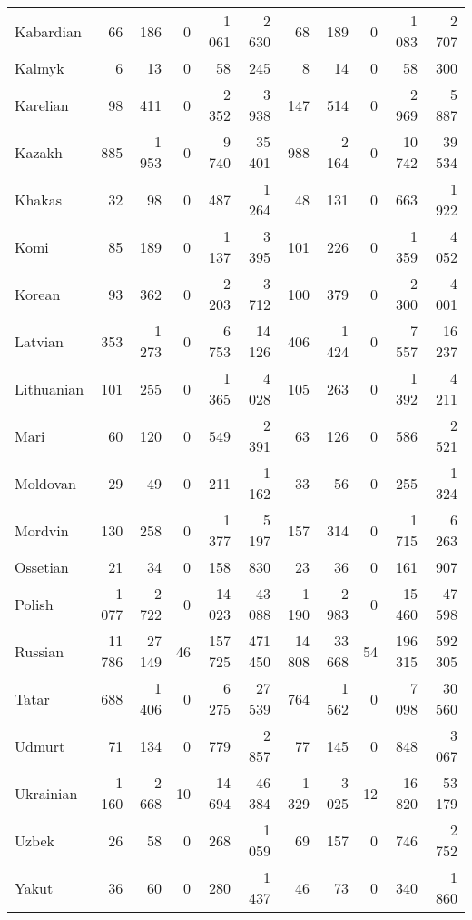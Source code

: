 \begin{table}[!h]
\begin{tabular}{lrrrrrrrrrr}
Kabardian & 66 & 186 & 0 & 1 061 & 2 630 & 68 & 189 & 0 & 1 083 & 2 707\\
Kalmyk & 6 & 13 & 0 & 58 & 245 & 8 & 14 & 0 & 58 & 300\\
Karelian & 98 & 411 & 0 & 2 352 & 3 938 & 147 & 514 & 0 & 2 969 & 5 887\\
Kazakh & 885 & 1 953 & 0 & 9 740 & 35 401 & 988 & 2 164 & 0 & 10 742 & 39 534\\
Khakas & 32 & 98 & 0 & 487 & 1 264 & 48 & 131 & 0 & 663 & 1 922\\
Komi & 85 & 189 & 0 & 1 137 & 3 395 & 101 & 226 & 0 & 1 359 & 4 052\\
Korean & 93 & 362 & 0 & 2 203 & 3 712 & 100 & 379 & 0 & 2 300 & 4 001\\
Latvian & 353 & 1 273 & 0 & 6 753 & 14 126 & 406 & 1 424 & 0 & 7 557 & 16 237\\
Lithuanian & 101 & 255 & 0 & 1 365 & 4 028 & 105 & 263 & 0 & 1 392 & 4 211\\
Mari & 60 & 120 & 0 & 549 & 2 391 & 63 & 126 & 0 & 586 & 2 521\\
Moldovan & 29 & 49 & 0 & 211 & 1 162 & 33 & 56 & 0 & 255 & 1 324\\
Mordvin & 130 & 258 & 0 & 1 377 & 5 197 & 157 & 314 & 0 & 1 715 & 6 263\\
Ossetian & 21 & 34 & 0 & 158 & 830 & 23 & 36 & 0 & 161 & 907\\
Polish & 1 077 & 2 722 & 0 & 14 023 & 43 088 & 1 190 & 2 983 & 0 & 15 460 & 47 598\\
Russian & 11 786 & 27 149 & 46 & 157 725 & 471 450 & 14 808 & 33 668 & 54 & 196 315 & 592 305\\
Tatar & 688 & 1 406 & 0 & 6 275 & 27 539 & 764 & 1 562 & 0 & 7 098 & 30 560\\
Udmurt & 71 & 134 & 0 & 779 & 2 857 & 77 & 145 & 0 & 848 & 3 067\\
Ukrainian & 1 160 & 2 668 & 10 & 14 694 & 46 384 & 1 329 & 3 025 & 12 & 16 820 & 53 179\\
Uzbek & 26 & 58 & 0 & 268 & 1 059 & 69 & 157 & 0 & 746 & 2 752\\
Yakut & 36 & 60 & 0 & 280 & 1 437 & 46 & 73 & 0 & 340 & 1 860\\
\bottomrule
\end{tabular}
\end{table}